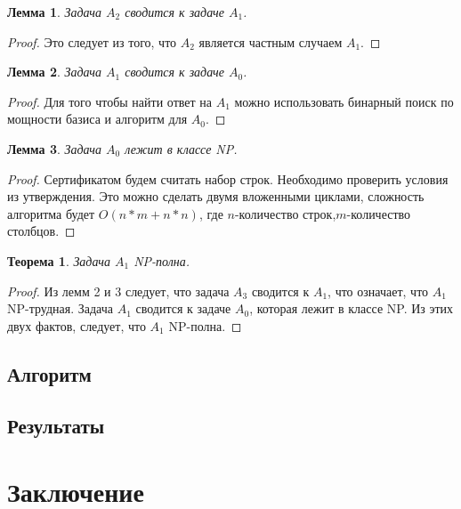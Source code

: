 \documentclass[a4paper,14pt]{extreport}
\newtheorem{thm}{Теорема}
\newtheorem{lm}{Лемма}
\begin{document}
\begin{lm}
Задача $A_2$ сводится к задаче $A_1$.
\end{lm}
\begin{proof}
Это следует из того, что $A_2$ является частным случаем $A_1$.
\end{proof}

\begin{lm}
Задача $A_1$ сводится к задаче $A_0$.
\end{lm}
\begin{proof}
Для того чтобы найти ответ на $A_1$ можно использовать бинарный поиск по мощности базиса и алгоритм для $A_0$.
\end{proof}

\begin{lm}
Задача $A_0$ лежит в классе NP.
\end{lm}
\begin{proof}
Сертификатом будем считать набор строк. Необходимо проверить условия из утверждения. Это можно сделать двумя вложенными циклами, сложность алгоритма будет $O(n*m+n*n)$, где $n$-количество строк,$m$-количество столбцов.
\end{proof}

\begin{thm}
Задача $A_1$ NP-полна.
\end{thm}
\begin{proof}
Из лемм 2 и 3 следует, что задача $A_3$ сводится к $A_1$, что означает, что $A_1$ NP-трудная. Задача $A_1$ сводится к задаче $A_0$, которая лежит в классе NP. Из этих двух фактов, следует, что $A_1$ NP-полна.  
\end{proof}
\section{Алгоритм}
\section{Результаты}


\chapter{Заключение}
\end{document}
